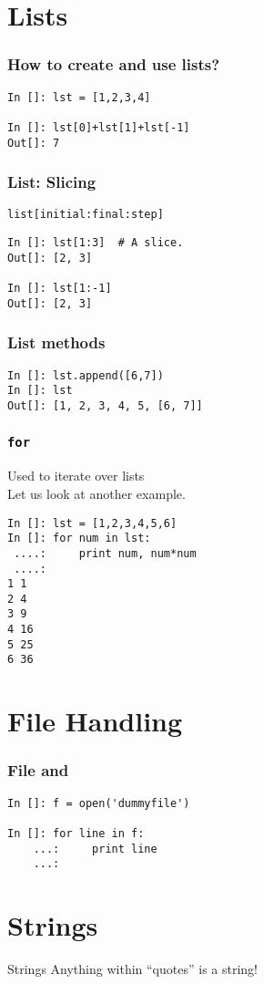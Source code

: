 \documentclass[14pt,compress]{beamer}
\newcounter{time}
\newcommand{\inctime}[1]{\addtocounter{time}{#1}{\tiny \thetime\ m}}
\newcommand{\typ}[1]{\lstinline{#1}}
\newcommand{\kwrd}[1]{ \texttt{\textbf{\color{blue}{#1}}}  }
\begin{document}
\section{Lists}
\begin{frame}[fragile]
  \frametitle{How to create and use lists?}
\begin{lstlisting}
In []: lst = [1,2,3,4] 

In []: lst[0]+lst[1]+lst[-1]
Out[]: 7
\end{lstlisting}
\end{frame}

\begin{frame}[fragile]
  \frametitle{List: Slicing}
  \typ{list[initial:final:step]}
\begin{lstlisting}
In []: lst[1:3]  # A slice.
Out[]: [2, 3]

In []: lst[1:-1]
Out[]: [2, 3]
\end{lstlisting}
\end{frame}

\begin{frame}[fragile]
  \frametitle{List methods}
\begin{lstlisting}
In []: lst.append([6,7])
In []: lst
Out[]: [1, 2, 3, 4, 5, [6, 7]]
\end{lstlisting}
\end{frame}

\begin{frame}[fragile]
\frametitle{\typ{for}}
Used to iterate over lists\\ Let us look at another example.
\begin{lstlisting}
In []: lst = [1,2,3,4,5,6]
In []: for num in lst:
 ....:     print num, num*num
 ....:    
1 1
2 4
3 9
4 16
5 25
6 36
\end{lstlisting}
\end{frame}

\section{File Handling}
\begin{frame}[fragile]
    \frametitle{File and \kwrd{for}}
\begin{lstlisting}
In []: f = open('dummyfile')

In []: for line in f:
    ...:     print line
    ...:  
\end{lstlisting}
\inctime{5}
\end{frame}

\section{Strings}
\begin{frame}{Strings}
Anything within ``quotes'' is a string!
\end{frame}
\end{document}
